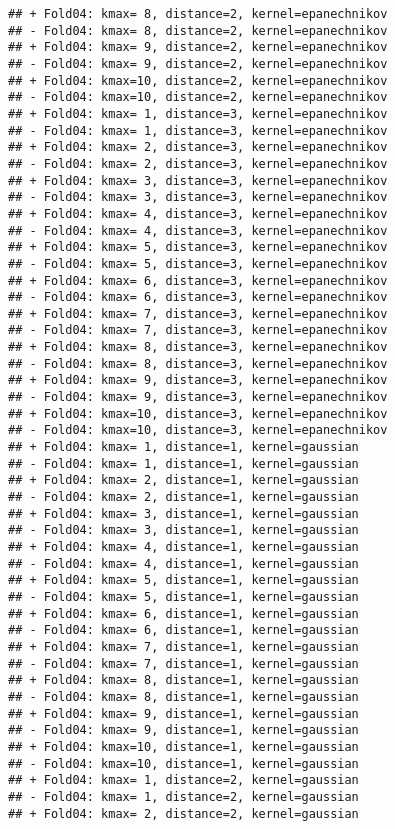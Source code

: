 \documentclass[
]{article}
\begin{document}
\begin{verbatim}
## + Fold04: kmax= 8, distance=2, kernel=epanechnikov 
## - Fold04: kmax= 8, distance=2, kernel=epanechnikov 
## + Fold04: kmax= 9, distance=2, kernel=epanechnikov 
## - Fold04: kmax= 9, distance=2, kernel=epanechnikov 
## + Fold04: kmax=10, distance=2, kernel=epanechnikov 
## - Fold04: kmax=10, distance=2, kernel=epanechnikov 
## + Fold04: kmax= 1, distance=3, kernel=epanechnikov 
## - Fold04: kmax= 1, distance=3, kernel=epanechnikov 
## + Fold04: kmax= 2, distance=3, kernel=epanechnikov 
## - Fold04: kmax= 2, distance=3, kernel=epanechnikov 
## + Fold04: kmax= 3, distance=3, kernel=epanechnikov 
## - Fold04: kmax= 3, distance=3, kernel=epanechnikov 
## + Fold04: kmax= 4, distance=3, kernel=epanechnikov 
## - Fold04: kmax= 4, distance=3, kernel=epanechnikov 
## + Fold04: kmax= 5, distance=3, kernel=epanechnikov 
## - Fold04: kmax= 5, distance=3, kernel=epanechnikov 
## + Fold04: kmax= 6, distance=3, kernel=epanechnikov 
## - Fold04: kmax= 6, distance=3, kernel=epanechnikov 
## + Fold04: kmax= 7, distance=3, kernel=epanechnikov 
## - Fold04: kmax= 7, distance=3, kernel=epanechnikov 
## + Fold04: kmax= 8, distance=3, kernel=epanechnikov 
## - Fold04: kmax= 8, distance=3, kernel=epanechnikov 
## + Fold04: kmax= 9, distance=3, kernel=epanechnikov 
## - Fold04: kmax= 9, distance=3, kernel=epanechnikov 
## + Fold04: kmax=10, distance=3, kernel=epanechnikov 
## - Fold04: kmax=10, distance=3, kernel=epanechnikov 
## + Fold04: kmax= 1, distance=1, kernel=gaussian 
## - Fold04: kmax= 1, distance=1, kernel=gaussian 
## + Fold04: kmax= 2, distance=1, kernel=gaussian 
## - Fold04: kmax= 2, distance=1, kernel=gaussian 
## + Fold04: kmax= 3, distance=1, kernel=gaussian 
## - Fold04: kmax= 3, distance=1, kernel=gaussian 
## + Fold04: kmax= 4, distance=1, kernel=gaussian 
## - Fold04: kmax= 4, distance=1, kernel=gaussian 
## + Fold04: kmax= 5, distance=1, kernel=gaussian 
## - Fold04: kmax= 5, distance=1, kernel=gaussian 
## + Fold04: kmax= 6, distance=1, kernel=gaussian 
## - Fold04: kmax= 6, distance=1, kernel=gaussian 
## + Fold04: kmax= 7, distance=1, kernel=gaussian 
## - Fold04: kmax= 7, distance=1, kernel=gaussian 
## + Fold04: kmax= 8, distance=1, kernel=gaussian 
## - Fold04: kmax= 8, distance=1, kernel=gaussian 
## + Fold04: kmax= 9, distance=1, kernel=gaussian 
## - Fold04: kmax= 9, distance=1, kernel=gaussian 
## + Fold04: kmax=10, distance=1, kernel=gaussian 
## - Fold04: kmax=10, distance=1, kernel=gaussian 
## + Fold04: kmax= 1, distance=2, kernel=gaussian 
## - Fold04: kmax= 1, distance=2, kernel=gaussian 
## + Fold04: kmax= 2, distance=2, kernel=gaussian 

\end{verbatim}
\end{document}
